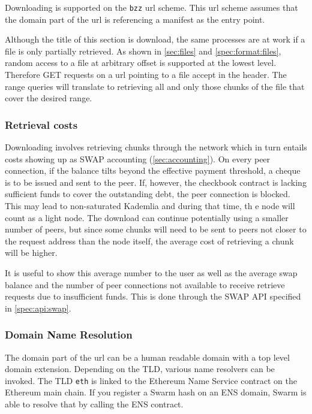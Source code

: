 Downloading is supported on the \texttt{bzz} url scheme. This url scheme assumes that the domain part of the url is referencing a manifest as the entry point. 

Although the title of this section is download, the same  processes are at work if a file is only partially retrieved. As shown in \ref{sec:files} and \ref{spec:format:files}, random access to a file at arbitrary offset is supported at the lowest level. Therefore GET requests on a url pointing to a file accept  in the header. The range queries will translate to retrieving all and only those chunks of the file that cover the desired range.  

\subsubsection{Retrieval costs}

Downloading involves retrieving chunks through the network which in turn entails costs showing up as SWAP accounting (\ref{sec:accounting}). On every peer  connection, if the balance tilts beyond the effective payment threshold, a cheque is to be issued and sent to the peer. If, however, the checkbook contract is lacking sufficient funds to cover the outstanding debt, the peer connection is blocked. This may lead to non-saturated Kademlia and during that time, th e node will count as a light node. The download can continue potentially using a smaller number of peers, but since some chunks will need to be sent to peers not closer to the request address than the node itself, the average cost of retrieving a chunk will be higher. 

It is useful to show this average number to the user as well as the average swap balance and the number of peer connections not available to receive retrieve requests due to insufficient funds. This is done through the SWAP API specified in \ref{spec:api:swap}.




\subsubsection{Domain Name Resolution}

The domain part of the url can be a human readable domain with a top level domain extension. Depending on the TLD, various name resolvers can be invoked. The TLD \texttt{eth} is linked to the Ethereum Name Service contract on the Ethereum main chain. If you register a Swarm hash on an ENS domain, Swarm is able to resolve that by calling the ENS contract. 

